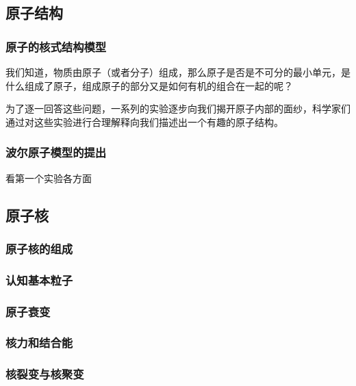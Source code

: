 \begin{issues}
\issueTODO
\end{issues}

\subsection{原子结构}
\subsubsection{原子的核式结构模型}
我们知道，物质由原子（或者分子）组成，那么原子是否是不可分的最小单元，是什么组成了原子，组成原子的部分又是如何有机的组合在一起的呢？

为了逐一回答这些问题，一系列的实验逐步向我们揭开原子内部的面纱，科学家们通过对这些实验进行合理解释向我们描述出一个有趣的原子结构。
\subsubsection{波尔原子模型的提出}%
看第一个实验各方面
\subsection{原子核}
\subsubsection{原子核的组成}
\subsubsection{认知基本粒子}
\subsubsection{原子衰变}
\subsubsection{核力和结合能}
\subsubsection{核裂变与核聚变}
